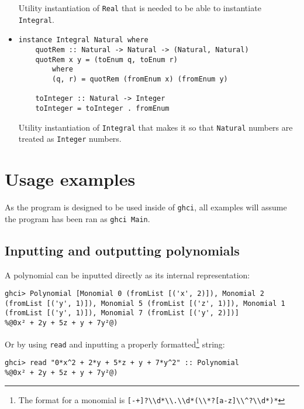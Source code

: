 \documentclass[11pt,a4paper]{article}
\begin{document}
\begin{itemize}
          Utility instantiation of \lstinline{Real} that is needed to be able to instantiate \lstinline{Integral}.

    \item \begin{lstlisting}
instance Integral Natural where
    quotRem :: Natural -> Natural -> (Natural, Natural)
    quotRem x y = (toEnum q, toEnum r)
        where
        (q, r) = quotRem (fromEnum x) (fromEnum y)
    
    toInteger :: Natural -> Integer
    toInteger = toInteger . fromEnum      
    \end{lstlisting}

          Utility instantiation of \lstinline{Integral} that makes it so that \lstinline{Natural} numbers are treated as \lstinline{Integer} numbers.

\end{itemize}

\section{Usage examples}

As the program is designed to be used inside of \lstinline{ghci}, all examples will assume the program has been ran as \lstinline{ghci Main}.

\subsection{Inputting and outputting polynomials}

A polynomial can be inputted directly as its internal representation:

\begin{lstlisting}
ghci> Polynomial [Monomial 0 (fromList [('x', 2)]), Monomial 2 (fromList [('y', 1)]), Monomial 5 (fromList [('z', 1)]), Monomial 1 (fromList [('y', 1)]), Monomial 7 (fromList [('y', 2)])]
%@0x² + 2y + 5z + y + 7y²@)
\end{lstlisting}

Or by using \lstinline{read} and inputting a properly formatted\footnote{The format for a monomial is \lstinline{[-+]?\\d*\\.\\d*(\\*?[a-z]\\^?\\d*)*}} string:

\begin{lstlisting}
ghci> read "0*x^2 + 2*y + 5*z + y + 7*y^2" :: Polynomial
%@0x² + 2y + 5z + y + 7y²@)
\end{lstlisting}
\end{document}
